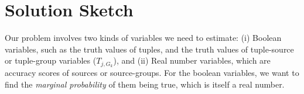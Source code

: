 \documentclass{sig-alternate}
\newcounter{prob}
\begin{document}


\section{Solution Sketch}
Our problem involves two kinds of variables we need to estimate: (i) Boolean variables, such as the truth values of tuples, and the truth values of tuple-source or tuple-group variables ($T_{j,G_k}$), and (ii) Real number variables, which are accuracy scores of sources or source-groups. For the boolean variables, we want to find the \textit{marginal probability} of them being true, which is itself a real number. 
\end{document}
